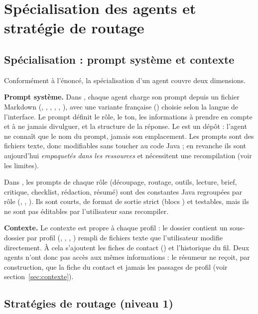 \section{Spécialisation des agents et stratégie de routage}

\subsection{Spécialisation : prompt système et contexte}

Conformément à l'énoncé, la spécialisation d'un agent couvre deux dimensions.

\textbf{Prompt système.} Dans , chaque agent charge son prompt depuis un fichier Markdown (, , , , , ), avec une variante française () choisie selon la langue de l'interface. Le prompt définit le rôle, le ton, les informations à prendre en compte et à ne jamais divulguer, et la structure de la réponse. Le  est un dépôt : l'agent ne connaît que le nom du prompt, jamais son emplacement. Les prompts sont des fichiers texte, donc modifiables sans toucher au code Java ; en revanche ils sont aujourd'hui \emph{empaquetés dans les ressources} et nécessitent une recompilation (voir les limites).

Dans , les prompts de chaque rôle (découpage, routage, outils, lecture, brief, critique, checklist, rédaction, résumé) sont des constantes Java regroupées par rôle (, , ). Ils sont courts, de format de sortie strict (blocs ) et testables, mais ils ne sont pas éditables par l'utilisateur sans recompiler.

\textbf{Contexte.} Le contexte est propre à chaque profil : le dossier  contient un sous-dossier par profil (, , , ) rempli de fichiers texte que l'utilisateur modifie directement. À cela s'ajoutent les fiches de contact () et l'historique du fil. Deux agents n'ont donc pas accès aux mêmes informations : le résumeur ne reçoit, par construction, que la fiche du contact et jamais les passages de profil (voir section~\ref{sec:contexte}).

\subsection{Stratégies de routage (niveau 1)}

